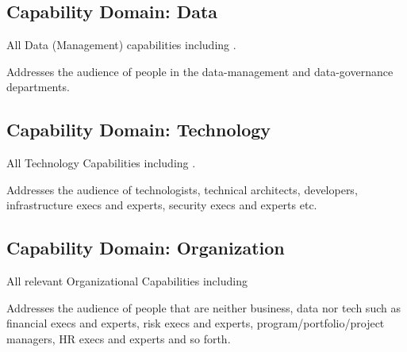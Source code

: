 \subsection{Capability Domain: Data}

All Data (Management) capabilities including .

Addresses the audience of people in the data-management and data-governance departments.

\subsection{Capability Domain: Technology}

All Technology Capabilities including .

Addresses the audience of technologists, technical architects, developers, infrastructure execs and experts,
security execs and experts etc.

\subsection{Capability Domain: Organization}

All relevant Organizational Capabilities including 

Addresses the audience of people that are neither business, data nor tech such as financial execs and experts, risk
execs and experts, program/portfolio/project managers, HR execs and experts and so forth.

